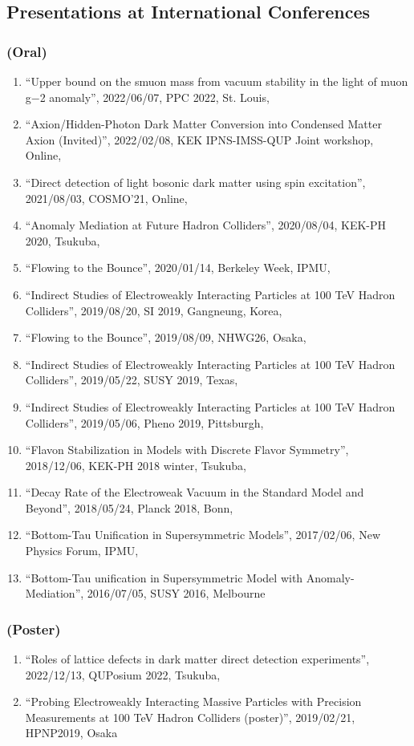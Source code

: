 \documentclass[12pt]{article}
\begin{document}
\subsection*{Presentations at International Conferences}
\subsubsection*{(Oral)}
\begin{enumerate}
 \item ``Upper bound on the smuon mass from vacuum stability in the light of muon g−2 anomaly'', 2022/06/07, PPC 2022, St. Louis,\item ``Axion/Hidden-Photon Dark Matter Conversion into Condensed Matter Axion (Invited)'', 2022/02/08, KEK IPNS-IMSS-QUP Joint workshop, Online,\item ``Direct detection of light bosonic dark matter using spin excitation'', 2021/08/03, COSMO'21, Online,\item ``Anomaly Mediation at Future Hadron Colliders'', 2020/08/04, KEK-PH 2020, Tsukuba,\item ``Flowing to the Bounce'', 2020/01/14, Berkeley Week, IPMU,\item ``Indirect Studies of Electroweakly Interacting Particles at 100 TeV Hadron Colliders'', 2019/08/20, SI 2019, Gangneung, Korea,\item ``Flowing to the Bounce'', 2019/08/09, NHWG26, Osaka,\item ``Indirect Studies of Electroweakly Interacting Particles at 100 TeV Hadron Colliders'', 2019/05/22, SUSY 2019, Texas,\item ``Indirect Studies of Electroweakly Interacting Particles at 100 TeV Hadron Colliders'', 2019/05/06, Pheno 2019, Pittsburgh,\item ``Flavon Stabilization in Models with Discrete Flavor Symmetry'', 2018/12/06, KEK-PH 2018 winter, Tsukuba,\item ``Decay Rate of the Electroweak Vacuum in the Standard Model and Beyond'', 2018/05/24, Planck 2018, Bonn,\item ``Bottom-Tau Unification in Supersymmetric Models'', 2017/02/06, New Physics Forum, IPMU,\item ``Bottom-Tau unification in Supersymmetric Model with Anomaly-Mediation'', 2016/07/05, SUSY 2016, Melbourne
\end{enumerate}
\subsubsection*{(Poster)}
\begin{enumerate}
 \item ``Roles of lattice defects in dark matter direct detection experiments'', 2022/12/13, QUPosium 2022, Tsukuba,\item ``Probing Electroweakly Interacting Massive Particles with Precision Measurements at 100 TeV Hadron Colliders (poster)'', 2019/02/21, HPNP2019, Osaka
\end{enumerate}
\end{document}
